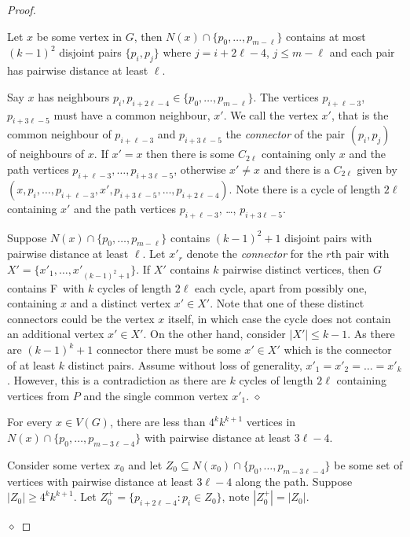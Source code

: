 \documentclass[10pt,a4paper]{amsart}
\newenvironment{claimproof}
{\noindent {\em Proof of Claim:} }
{\hfill $\diamond$ \smallskip}
\newcommand{\forbiddenGraph}{F}
\begin{document}
\begin{proof}
    \begin{mclaim}\label{clm:dist2l-4}
            Let $x$ be some vertex in $G$, then $N(x) \cap \{p_0,\dots,p_{m-\ell}\}$ contains at most $(k-1)^2$ disjoint pairs $\{p_i,p_j\}$ where $j = i+2\ell-4$, $j \leq m- \ell$ and each pair has pairwise distance at least $\ell$.
    \end{mclaim}
    \begin{claimproof}
            Say $x$ has neighbours $p_i, p_{i+2\ell-4} \in \{p_0,\dots,p_{m-\ell}\}$. The vertices $p_{i+\ell-3}$, $p_{i+3\ell-5}$ must have a common neighbour, $x'$. We call the vertex $x'$, that is the common neighbour of $p_{i+\ell-3}$ and $p_{i+3\ell-5}$ the \emph{connector} of the pair $(p_i,p_j)$ of neighbours of $x$. If $x'=x$ then there is some $C_{2\ell}$ containing only $x$ and the path vertices $p_{i+\ell-3}, \dots, p_{i+3\ell-5}$, otherwise $x'\neq x$ and there is a $C_{2\ell}$ given by $(x, p_i, \ldots, p_{i+\ell-3}, x', p_{i+3\ell-5}, \ldots, p_{i+2\ell-4})$. Note there is a cycle of length $2\ell$ containing $x'$ and the path vertices $p_{i+\ell-3}$, \ldots, $p_{i+3\ell-5}$.

            Suppose $N(x) \cap \{p_0,\dots,p_{m-\ell}\}$ contains $(k-1)^2+1$ disjoint pairs with pairwise distance at least $\ell$. Let $x'_r$ denote the \emph{connector} for the $r$th pair with $X' = \{x'_1,\dots, x'_{(k-1)^2+1}\}$. If $X'$ contains $k$ pairwise distinct vertices, then $G$ contains \forbiddenGraph\ with $k$ cycles of length $2\ell$ each cycle, apart from possibly one, containing $x$ and a distinct vertex $x' \in X'$. Note that one of these distinct connectors could be the vertex $x$ itself, in which case the cycle does not contain an additional vertex $x'\in X'$. 
            On the other hand, consider $|X'| \leq k-1$. As there are $(k-1)^k+1$ connector there must be some $x'\in X'$ which is the connector of at least $k$ distinct pairs. Assume without loss of generality, $x'_1=x'_2=\ldots=x'_k$. However, this is a contradiction as there are $k$ cycles of length $2\ell$ containing vertices from $P$ and the single common vertex $x'_1$.
    \end{claimproof}

    \begin{mclaim}\label{clm:vbndnei}
            For every $x \in V(G)$, there are less than $4^kk^{k+1}$ vertices in $N(x) \cap \{p_0,\dots,p_{m-3\ell-4}\}$ 
            with pairwise distance at least $3\ell-4$.
    \end{mclaim}
    \begin{claimproof}
        Consider some vertex $x_0$ and let $Z_0 \subseteq N(x_0) \cap \{p_0,\dots,p_{m-3\ell-4}\}$ be some set of vertices with pairwise distance at least $3\ell-4$ along the path. Suppose $|Z_0| \geq 4^kk^{k+1}$. 
        Let $Z^+_0 = \{ p_{i+2\ell-4}: p_i \in Z_0 \}$, note $|Z^+_0| = |Z_0|$.
        

\end{claimproof}
\end{proof}
\end{document}
